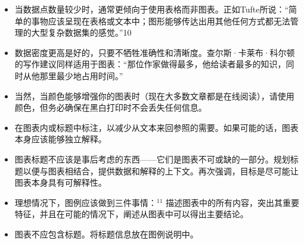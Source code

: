 \begin{itemize}
\item 当数据点数量较少时，通常更倾向于使用表格而非图表。正如Tufte所说：“简单的事物应该呈现在表格或文本中；图形能够传达出用其他任何方式都无法管理的大型复杂数据集的感觉。”10
\item 数据密度更高是好的，只要不牺牲准确性和清晰度。查尔斯·卡莱布·科尔顿的写作建议同样适用于图表：“那位作家做得最多，他给读者最多的知识，同时从他那里最少地占用时间。”
\item 当然，当颜色能够增强你的图表时（现在大多数文章都是在线阅读），请使用颜色，但务必确保在黑白打印时不会丢失任何信息。
\item 在图表内或标题中标注，以减少从文本来回参照的需要。如果可能的话，图表本身应该能够独立解释。
\item 图表标题不应该是事后考虑的东西——它们是图表不可或缺的一部分。规划标题以便与图表相结合，提供数据和解释的上下文。再次强调，目标是尽可能让图表本身具有可解释性。
\item 理想情况下，图例应该做到三件事情：${ }^{11}$ 描述图表中的所有内容，突出其重要特征，并且在可能的情况下，阐述从图表中可以得出主要结论。
\item 图表不应包含标题。将标题信息放在图例说明中。

\end{itemize}

